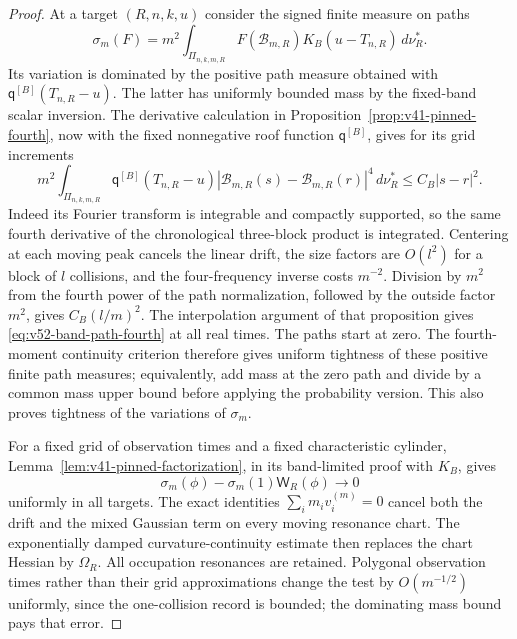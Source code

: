 \begin{proof}
At a target $(R,n,k,u)$ consider the signed finite measure on paths
\[
 \sigma_m(F)=m^2\int_{\Pi_{n,k,m,R}}
           F(\mathcal B_{m,R})K_B(u-T_{n,R})\,d\nu_R^*.
\]
Its variation is dominated by the positive path measure obtained
with $\mathsf q^{[B]}(T_{n,R}-u)$. The latter has uniformly bounded mass by the
fixed-band scalar inversion. The derivative calculation in
Proposition~\ref{prop:v41-pinned-fourth}, now with the fixed
nonnegative roof function $\mathsf q^{[B]}$, gives for its grid increments
\begin{equation}\label{eq:v52-band-path-fourth}
 m^2\int_{\Pi_{n,k,m,R}}\mathsf q^{[B]}(T_{n,R}-u)
  |\mathcal B_{m,R}(s)-\mathcal B_{m,R}(r)|^4\,d\nu_R^*
                                   \le C_B|s-r|^2.
\end{equation}
Indeed its Fourier transform is integrable and compactly supported,
so the same fourth derivative of the chronological three-block
product is integrated. Centering at each moving peak cancels the
linear drift, the size factors are $O(l^2)$ for a block of $l$
collisions, and the four-frequency inverse costs $m^{-2}$.
Division by $m^2$ from the fourth power of the path normalization,
followed by the outside factor $m^2$, gives $C_B(l/m)^2$.
The interpolation argument of that proposition gives
\eqref{eq:v52-band-path-fourth} at all real times. The paths start
at zero. The fourth-moment continuity criterion therefore gives
uniform tightness of these positive finite path measures; equivalently,
add mass at the zero path and divide by a common mass upper bound
before applying the probability version. This also proves tightness
of the variations of $\sigma_m$.

For a fixed grid of observation times and a fixed characteristic
cylinder, Lemma~\ref{lem:v41-pinned-factorization}, in its
band-limited proof with $K_B$, gives
\[
 \sigma_m(\phi)-\sigma_m(1)\mathsf W_R(\phi)\longrightarrow0
\]
uniformly in all targets. The exact identities
$\sum_i m_iv_i^{(m)}=0$ cancel both the drift and the mixed Gaussian
term on every moving resonance chart. The exponentially damped
curvature-continuity estimate then replaces the chart Hessian by
$\Omega_R$. All occupation resonances are retained.
Polygonal observation times rather than their grid approximations
change the test by $O(m^{-1/2})$ uniformly, since the one-collision
record is bounded; the dominating mass bound pays that error.


\end{proof}
